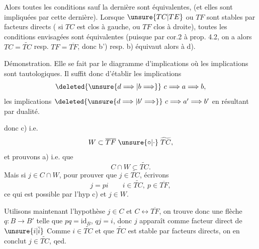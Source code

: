 Alors toutes les conditions sauf la dernière sont équivalentes, (et elles sont  impliquées par cette dernière).
 Lorsque $\unsure{TC|TE}$ ou $TF$ sont stables par facteurs directs ( si $TC$ est clos à gauche, ou $TF$ clos à droite), toutes les conditions envisagées sont équivalentes (puisque par cor.2 à prop. 4.2, on a alors $TC=\widetilde{TC}$ resp. $TF=\overline{TF}$, donc b') resp. b) équivaut alors à d).

Démonstration. Elle se fait par le diagramme d'implications
où les  implications   sont tautologiques. Il suffit donc d'établir les  implications
\[
\deleted{\unsure{d\Longrightarrow|b\Longrightarrow}}\ c\Longrightarrow a\Longrightarrow b,
\]
les implications $\deleted{\unsure{d\Longrightarrow|b'\Longrightarrow}}\ c\Longrightarrow a'\Longrightarrow b'$ en résultant par dualité. 

  donc c) i.e.
\[
W\subset\overline{TF}\mathrel{\unsure{\circ|\cdot}}\widetilde{TC},
\]
et prouvons a) i.e. que
\[
C\cap W\subset\widetilde{TC}.
\]
Mais si $j\in C\cap W$, pour prouver que $j\in\widetilde{TC}$, écrivons
\[
j=pi\qquad i\in\widetilde{TC},\ p\in\overline{TF},
\]
ce qui est possible par l'hyp c) et $j\in W$.

Utilisons maintenant l'hypothèse $j\in C$ et $C\longleftrightarrow\overline{TF}$, on trouve donc  une flèche $q:B\longrightarrow B'$ telle que $pq=\mathrm{id}_B$, $qj=i$, donc $j$ apparaît comme facteur direct de $\unsure{i|\check{i}}$ Comme $i\in\widetilde{TC}$ et que $\widetilde{TC}$ est stable par facteurs directs, on en conclut $j\in\widetilde{TC}$, qed.


